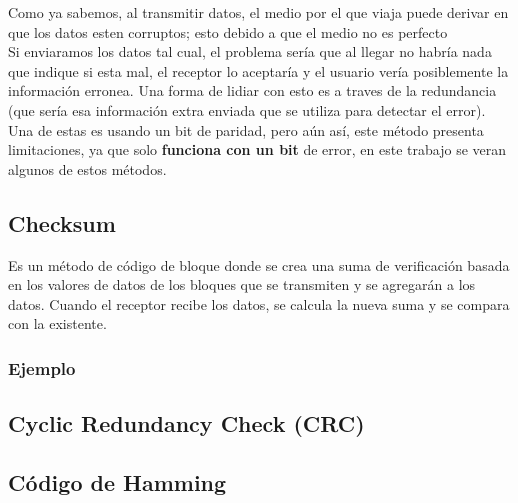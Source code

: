 Como ya sabemos, al transmitir datos, el medio por el que viaja puede derivar en que los datos esten corruptos; esto debido a que el medio no es perfecto \\${ }$\\
Si enviaramos los datos tal cual, el problema sería que al llegar no habría nada que indique si esta mal, el receptor lo aceptaría y el usuario vería posiblemente la información erronea. Una forma de lidiar con esto es a traves de la redundancia (que sería esa información extra enviada que se utiliza para detectar el error). Una de estas es usando un bit de paridad, pero aún así, este método presenta limitaciones, ya que solo \textbf{funciona con un bit} de error, en este trabajo se veran algunos de estos métodos.
\subsection*{Checksum}
Es un método de código de bloque donde se crea una suma de verificación  basada en los valores de datos de los bloques que se transmiten y se agregarán a los datos. Cuando el receptor recibe los datos, se calcula la nueva suma y se compara con la existente.
\subsubsection*{Ejemplo}
\subsection*{Cyclic Redundancy Check (CRC)}
\subsection*{Código de Hamming}
 

 

